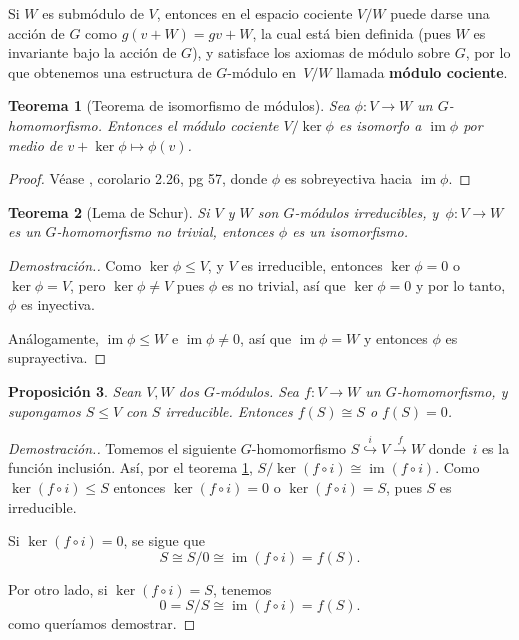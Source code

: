 \documentclass[12pt]{book}
\newtheorem{theorem}{Teorema}[section]
\newtheorem{proposition}[theorem]{Proposición}
\theoremstyle{definition}
\newcounter{in}
\newcounter{ini}
\DeclareMathOperator{\im}{im}
\begin{document}
\begin{mdframed}
Si $W$ es submódulo de $V$, entonces en el espacio cociente
$V/W$ puede darse una acción de $G$ como $g(v+W)=gv+W$, la cual está
bien definida (pues $W$ es invariante bajo la acción de $G$), y
satisface los axiomas de módulo sobre $G$, por lo que obtenemos una
estructura de $G$-módulo en~$V/W$ llamada \textbf{módulo cociente}.

\begin{theorem}[Teorema de isomorfismo de módulos]
  \label{teorema-isomorfismo-mod}
  Sea $\phi:V\rightarrow W$ un $G$-homomorfismo. Entonces el
  módulo cociente $V/\ker\phi$ es isomorfo a $\im\phi$ por medio de
  $v+\ker\phi\mapsto\phi(v)$.
\end{theorem}
\begin{proof}
Véase \cite{knapp2007basic}, corolario 2.26, pg 57, donde $\phi$ es sobreyectiva hacia $\im\phi$.
\end{proof}
\begin{theorem}[Lema de Schur]
  \label{lema-schur}
  Si $V$ y $W$ son $G$-módulos irreducibles, y~$\phi:V\rightarrow W$
  es un $G$-homomorfismo no trivial, entonces $\phi$ es un isomorfismo.
\end{theorem}

\begin{proof}[Demostración.]
  Como $\ker \phi\leq V$, y $V$ es irreducible, entonces $\ker \phi=0$
  o~$\ker\phi=V$, pero  $\ker\phi\neq V$ pues $\phi$ es no trivial,
  así que $\ker \phi=0$ y por lo tanto, $\phi$ es inyectiva. 

  Análogamente, $\im\phi\leq W$ e $\im \phi\neq 0$, así que $\im
  \phi=W$ y entonces $\phi$ es suprayectiva.
\end{proof}

\begin{proposition}
  \label{im-mod-irreducible}
  Sean $V,W$ dos $G$-módulos. Sea $f:V\rightarrow W$ un
  $G$-homomorfismo, y supongamos $S\leq V$ con $S$ irreducible. Entonces $f(S)\cong
  S$ o $f(S)=0$.
\end{proposition}

\begin{proof}[Demostración.]
  Tomemos el siguiente $G$-homomorfismo
  $S\stackrel{i}{\hookrightarrow} V\stackrel{f}{\rightarrow}W$
  donde~$i$ es la función inclusión. Así, por el teorema \ref{teorema-isomorfismo-mod}, $S/\ker(f\circ
  i)\cong\im(f\circ i)$. Como $\ker(f\circ
  i)\leq S$ entonces $\ker(f\circ i)=0$ o $\ker(f\circ i)=S$, pues $S$
  es irreducible.

  Si $\ker(f\circ i)=0$, se sigue que
  $$S\cong S/0\cong\im(f\circ i)=f(S).$$

  Por otro lado, si $\ker(f\circ i)=S$, tenemos
  $$0=S/S\cong\im(f\circ i)=f(S).$$
  como queríamos demostrar.
\end{proof}
\end{mdframed}
\end{document}
